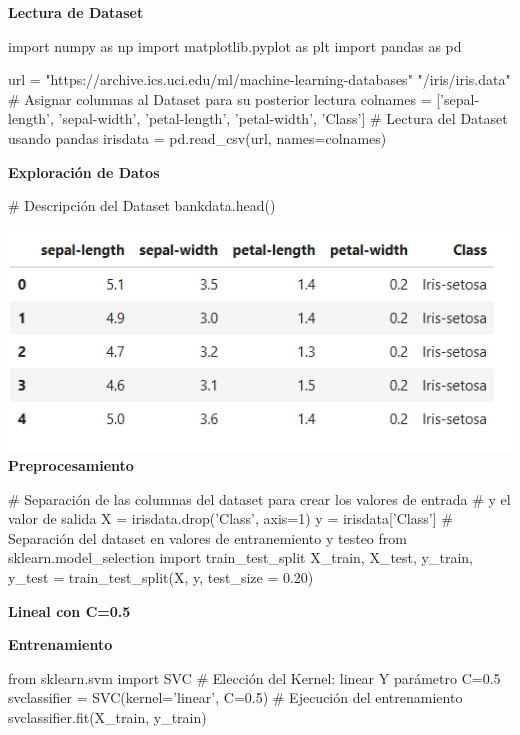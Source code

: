 \documentclass[paper=a4, fontsize=11pt]{scrartcl}
\numberwithin{equation}{section}		%
\numberwithin{figure}{section}			%
\numberwithin{table}{section}				%
\begin{document}
    \textbf{Lectura de Dataset}
    
    \begin{python}
    import numpy as np  
    import matplotlib.pyplot as plt  
    import pandas as pd
    
    url = "https://archive.ics.uci.edu/ml/machine-learning-databases"
          "/iris/iris.data"
    # Asignar columnas al Dataset para su posterior lectura
    colnames = ['sepal-length', 'sepal-width', 
                'petal-length', 'petal-width', 'Class']
    # Lectura del Dataset usando pandas
    irisdata = pd.read_csv(url, names=colnames)
    \end{python}
    
    \textbf{Exploración de Datos}
    
    \begin{python}
    # Descripción del Dataset
    bankdata.head()
    \end{python}
    
    \includegraphics[scale=0.8]{df2_head}
    \newpage
    \textbf{Preprocesamiento}
    
    \begin{python}
    # Separación de las columnas del dataset para crear los valores de entrada
    # y el valor de salida
    X = irisdata.drop('Class', axis=1)  
    y = irisdata['Class'] 
    # Separación del dataset en valores de entranemiento y testeo
    from sklearn.model_selection import train_test_split  
    X_train, X_test, y_train, y_test = train_test_split(X, y, test_size = 0.20) 
    \end{python}
    
    \textbf{Lineal con C=0.5}
    
    \textbf{Entrenamiento}
    
    \begin{python}
    from sklearn.svm import SVC
    # Elección del Kernel: linear Y parámetro C=0.5
    svclassifier = SVC(kernel='linear', C=0.5)
    # Ejecución del entrenamiento
    svclassifier.fit(X_train, y_train)
    \end{python}
    
\end{document}
